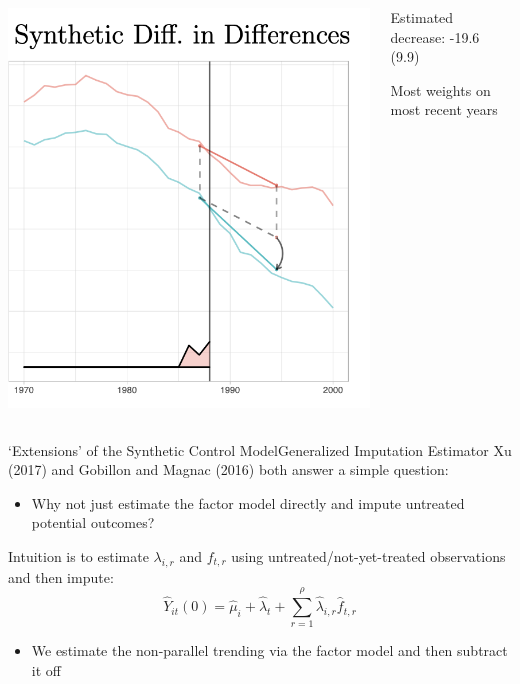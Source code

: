 \documentclass[t]{beamer}
\begin{document}
\begin{columns}[T]
  \begin{column}{.65\textwidth}
    \includegraphics[width=\textwidth]{lecture_includes/sdid_3.png}
  \end{column}
  \hfill
  \begin{column}{.3\textwidth}
    Estimated decrease: -19.6 (9.9)

    \bigskip Most weights on most recent years
  \end{column}
\end{columns}


\begin{frame}{`Extensions' of the Synthetic Control Model}{Generalized Imputation Estimator}
  Xu (2017) and Gobillon and Magnac (2016) both answer a simple question:
  \begin{itemize}
    \item Why not just estimate the factor model directly and impute untreated potential outcomes?
  \end{itemize}

  \bigskip
  Intuition is to estimate $\lambda_{i,r}$ and $f_{t,r}$ using untreated/not-yet-treated observations and then impute:
  $$
    \hat{Y}_{it}(0) = \hat{\mu}_i + \hat{\lambda}_t + \sum_{r=1}^\rho \hat{\lambda}_{i, r} \hat{f}_{t, r}
  $$
  \begin{itemize}
    \item We estimate the non-parallel trending via the factor model and then subtract it off
  \end{itemize}
\end{frame}
\end{document}
